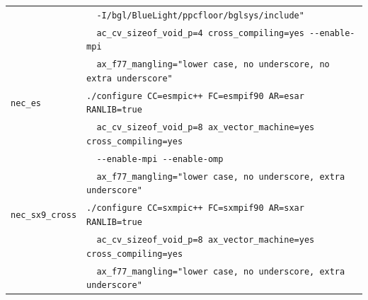 \documentclass[a4paper]{article}
\begin{document}
\begin{table}[htbp]
\begin{center}
\begin{tabular}{|l|l|}
                      & \verb+  -I/bgl/BlueLight/ppcfloor/bglsys/include"+ \\
                      & \verb+  ac_cv_sizeof_void_p=4 cross_compiling=yes --enable-mpi+\\
                      & \verb+  ax_f77_mangling="lower case, no underscore, no extra underscore"+ \\ \hline
\verb+nec_es+         & \verb|./configure CC=esmpic++ FC=esmpif90 AR=esar RANLIB=true | \\
                      & \verb+  ac_cv_sizeof_void_p=8 ax_vector_machine=yes cross_compiling=yes+ \\
                      & \verb+  --enable-mpi --enable-omp+ \\
                      & \verb+  ax_f77_mangling="lower case, no underscore, extra underscore"+ \\ \hline
\verb+nec_sx9_cross+  & \verb|./configure CC=sxmpic++ FC=sxmpif90 AR=sxar RANLIB=true | \\
                      & \verb+  ac_cv_sizeof_void_p=8 ax_vector_machine=yes cross_compiling=yes+ \\ 
                      & \verb+  ax_f77_mangling="lower case, no underscore, extra underscore"+ \\ \hline
\end{tabular}
\end{center}
\end{table}
\end{document}

